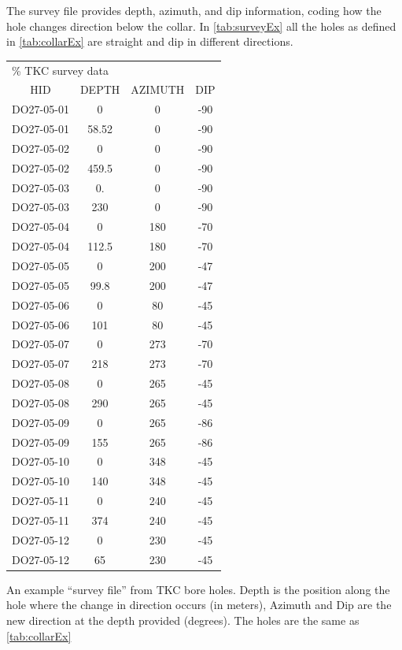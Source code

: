 The survey file provides depth, azimuth, and dip information, coding how the hole changes direction below the collar. In \autoref{tab:surveyEx} all the holes as defined in  \autoref{tab:collarEx} are straight and dip in different directions. 
\begin{fileExample}
\begin{tabular}{|cccc|}
\hline
\multicolumn{4}{|l|}{\% TKC survey data} \\
HID & DEPTH & AZIMUTH & DIP \\
DO27-05-01 & 0 & 0 & -90 \\
DO27-05-01 & 58.52 & 0 & -90 \\
DO27-05-02 & 0 & 0 & -90 \\
DO27-05-02 & 459.5 & 0 & -90 \\
DO27-05-03 & 0. & 0 & -90 \\
DO27-05-03 & 230 & 0 & -90 \\
DO27-05-04 & 0 & 180 & -70 \\
DO27-05-04 & 112.5 & 180 & -70 \\
DO27-05-05 & 0 & 200 & -47 \\
DO27-05-05 & 99.8 & 200 & -47 \\
DO27-05-06 & 0 & 80 & -45 \\
DO27-05-06 & 101 & 80 & -45 \\
DO27-05-07 & 0 & 273 & -70 \\
DO27-05-07 & 218 & 273 & -70 \\
DO27-05-08 & 0 & 265 & -45 \\
DO27-05-08 & 290 & 265 & -45 \\
DO27-05-09 & 0 & 265 & -86 \\
DO27-05-09 & 155 & 265 & -86 \\
DO27-05-10 & 0 & 348 & -45 \\
DO27-05-10 & 140 & 348 & -45 \\
DO27-05-11 & 0 & 240 & -45 \\
DO27-05-11 & 374 & 240 & -45 \\
DO27-05-12 & 0 & 230 & -45 \\
DO27-05-12 & 65 & 230 & -45 \\
\hline
\end{tabular}
\caption{An example ``survey file'' from TKC bore holes. Depth is the position along the hole where the change in direction occurs (in meters), Azimuth and Dip are the new direction at the depth provided (degrees). The holes are the same as \autoref{tab:collarEx}}
\label{tab:surveyEx}
\end{fileExample}

